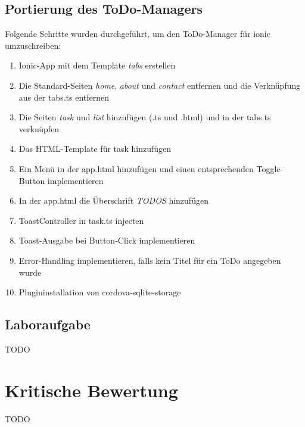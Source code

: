 \documentclass[german]{lni}
\begin{document}
\subsection{Portierung des ToDo-Managers}
Folgende Schritte wurden durchgeführt, um den ToDo-Manager für ionic umzuschreiben:
\begin{enumerate}
	\item Ionic-App mit dem Template \emph{tabs} erstellen
	\item Die Standard-Seiten \emph{home}, \emph{about} und \emph{contact} entfernen und die Verknüpfung aus der tabs.ts entfernen
	\item Die Seiten \emph{task} und \emph{list} hinzufügen (.ts und .html) und in der tabs.ts verknüpfen
	\item Das HTML-Template für task hinzufügen
	\item Ein Menü in der app.html hinzufügen und einen entsprechenden Toggle-Button implementieren
	\item In der app.html die Überschrift \emph{TODOS} hinzufügen
	\item ToastController in task.ts injecten
	\item Toast-Ausgabe bei Button-Click implementieren
	\item Error-Handling implementieren, falls kein Titel für ein ToDo angegeben wurde
	\item Plugininstallation von cordova-sqlite-storage	
\end{enumerate}

\subsection{Laboraufgabe}
TODO
\section{Kritische Bewertung}
TODO

%
\end{document}
